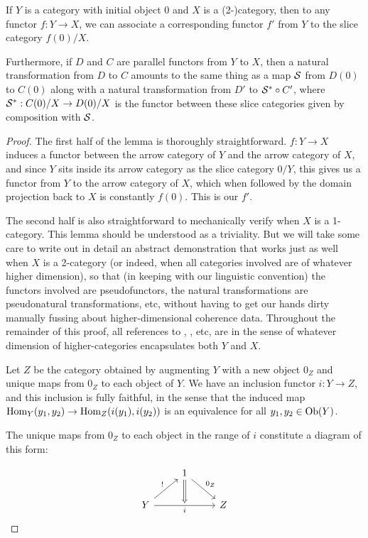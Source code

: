 \begin{lemma}\label{Lemma1}
If $Y$ is a category with initial object $0$ and $X$ is a (2-)category, then to any functor $f : Y \to X$, we can associate a corresponding functor $f'$ from $Y$ to the slice category $f(0)/X$.

Furthermore, if $D$ and $C$ are parallel functors from $Y$ to $X$, then a natural transformation from $D$ to $C$ amounts to the same thing as a map $\mathcal{S}$ from $D(0)$ to $C(0)$ along with a natural transformation from $D'$ to $\mathcal{S}^{*} \circ C'$, where $\mathcal{S}^{*} : C(0)/X \to D(0)/X$ is the functor between these slice categories given by composition with $\mathcal{S}$.
\end{lemma}
\begin{proof}
The first half of the lemma is thoroughly straightforward. $f : Y \to X$ induces a functor between the arrow category of $Y$ and the arrow category of $X$, and since $Y$ sits inside its arrow category as the slice category $0/Y$, this gives us a functor from $Y$ to the arrow category of $X$, which when followed by the domain projection back to $X$ is constantly $f(0)$. This is our $f'$.

The second half is also straightforward to mechanically verify when $X$ is a 1-category. This lemma should be understood as a triviality. But we will take some care to write out in detail an abstract demonstration that works just as well when $X$ is a 2-category (or indeed, when all categories involved are of whatever higher dimension), so that (in keeping with our linguistic convention) the functors involved are pseudofunctors, the natural transformations are pseudonatural transformations, etc, without having to get our hands dirty manually fussing about higher-dimensional coherence data. Throughout the remainder of this proof, all references to , , etc, are in the sense of whatever dimension of higher-categories encapsulates both $Y$ and $X$.

Let $Z$ be the category obtained by augmenting $Y$ with a new object $0_Z$ and unique maps from $0_Z$ to each object of $Y$. We have an inclusion functor $i : Y \to Z$, and this inclusion is fully faithful, in the sense that the induced map $\operatorname{Hom}_Y(y_1, y_2) \to \operatorname{Hom}_Z(i(y_1), i(y_2))$ is an equivalence for all $y_1, y_2 \in \operatorname{Ob}(Y)$.

The unique maps from $0_Z$ to each object in the range of $i$ constitute a diagram of this form:

\[\begin{tikzcd}
	& 1 \\
	Y && Z
	\arrow["\unique", from=2-1, to=1-2]
	\arrow["{0_Z}", from=1-2, to=2-3]
	\arrow[""{name=0, anchor=center}, "i"', from=2-1, to=2-3]
	\arrow[Rightarrow, from=1-2, to=0]
\end{tikzcd}\]


\end{proof}
